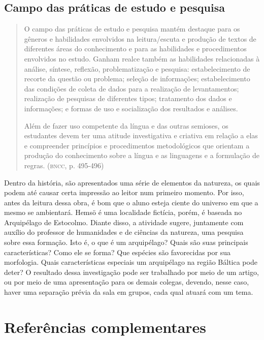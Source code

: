 \documentclass[12pt]{extarticle}
\begin{document}
\subsection{Campo das práticas de estudo e pesquisa}

\begin{quote}
O campo das práticas de estudo e pesquisa mantém destaque para os
gêneros e habilidades envolvidos na leitura/escuta e produção de textos
de diferentes áreas do conhecimento e para as habilidades e
procedimentos envolvidos no estudo. Ganham realce também as habilidades
relacionadas à análise, síntese, reflexão, problematização e pesquisa:
estabelecimento de recorte da questão ou problema; seleção de
informações; estabelecimento das condições de coleta de dados para a
realização de levantamentos; realização de pesquisas de diferentes
tipos; tratamento dos dados e informações; e formas de uso e
socialização dos resultados e análises.

Além de fazer uso competente da língua e das outras semioses, os
estudantes devem ter uma atitude investigativa e criativa em relação a
elas e compreender princípios e procedimentos metodológicos que orientam
a produção do conhecimento sobre a língua e as linguagens e a formulação
de regras. (\textsc{bncc}, p. 495-496)
\end{quote}

Dentro da história, são apresentados uma série de elementos da
natureza, os quais podem até causar certa impressão ao leitor num
primeiro momento. Por isso, antes da leitura dessa obra, é bom que o
aluno esteja ciente do universo em que a mesmo se ambientará. Hemsö é
uma localidade fictícia, porém, é baseada no Arquipélago de Estocolmo.
Diante disso, a atividade sugere, juntamente com auxílio do professor de
humanidades e de ciências da natureza, uma pesquisa sobre essa formação.
Isto é, o que é um arquipélago? Quais são suas principais
características? Como ele se forma? Que espécies são favorecidas por sua
morfologia. Quais características especiais um arquipélago na região
Báltica pode deter? O resultado dessa investigação pode ser trabalhado
por meio de um artigo, ou por meio de uma apresentação para os demais
colegas, devendo, nesse caso, haver uma separação prévia da sala em
grupos, cada qual atuará com um tema.




\section{Referências complementares}
\end{document}
